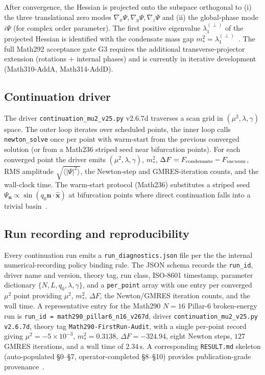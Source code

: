After convergence, the Hessian is projected onto the subspace
orthogonal to (i) the three translational zero modes
$\nabla_x\Psi, \nabla_y\Psi, \nabla_z\Psi$ and (ii) the global-phase
mode $i\Psi$ (for complex order parameter). The first positive
eigenvalue $\lambda_1^{(\perp)}$ of the projected Hessian is
identified with the condensate mass gap
$m_*^2 = \lambda_1^{(\perp)}$~\cite{Math73}. The full Math292
acceptance gate G3 requires the additional transverse-projector
extension (rotations + internal phases) and is currently in
iterative development (Math310-AddA, Math314-AddD).

\subsection{Continuation driver}

The driver \texttt{continuation\_mu2\_v25.py} v2.6.7d traverses a
scan grid in $(\mu^2, \lambda, \gamma)$ space. The outer loop
iterates over scheduled points, the inner loop calls
\texttt{newton\_solve} once per point with warm-start from the
previous converged solution (or from a Math236 striped seed near
bifurcation points). For each converged point the driver emits
$(\mu^2, \lambda, \gamma)$, $m_*^2$, $\Delta F = F_{\rm condensate}
- F_{\rm vacuum}$, RMS amplitude $\sqrt{\langle|\Psi|^2\rangle}$,
the Newton-step and GMRES-iteration counts, and the wall-clock
time. The warm-start protocol (Math236) substitutes a striped
seed $\Psi_{\mathbf{n}} \propto \sin(q_0 \mathbf{n} \cdot
\hat{\mathbf{x}})$ at bifurcation points where direct continuation
falls into a trivial basin~\cite{Math236_seed_striped}.

\subsection{Run recording and reproducibility}

Every continuation run emits a \texttt{run\_diagnostics.json} file
per the the internal numerical-recording policy binding rule. The JSON schema records the
\texttt{run\_id}, driver name and version, theory tag, run class,
ISO-8601 timestamp, parameter dictionary
$\{N, L, q_0, \lambda, \gamma\}$, and a \texttt{per\_point} array
with one entry per converged $\mu^2$ point providing
$\mu^2$, $m_*^2$, $\Delta F$, the Newton/GMRES iteration counts,
and the wall time. A representative entry for the Math290
$N=16$ Pillar-6 broken-energy run is
\texttt{run\_id = math290\_pillar6\_n16\_v267d}, driver
\texttt{continuation\_mu2\_v25.py v2.6.7d}, theory tag
\texttt{Math290-FirstRun-Audit}, with a single per-point record
giving $\mu^2 = -5\times 10^{-3}$, $m_*^2 = 0.3138$,
$\Delta F = -324.94$, eight Newton steps, $127$ GMRES iterations,
and a wall time of $2.34\,\mathrm{s}$. A corresponding
\texttt{RESULT.md} skeleton (auto-populated \S 0--\S 7,
operator-completed \S 8--\S 10) provides publication-grade
provenance~\cite{Math236}.

